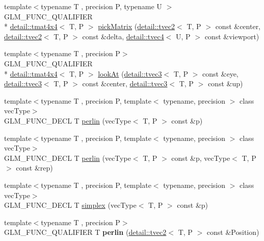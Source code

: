 \begin{DoxyCompactItemize}
\item 
{\footnotesize template$<$typename T , precision P, typename U $>$ }\\G\-L\-M\-\_\-\-F\-U\-N\-C\-\_\-\-Q\-U\-A\-L\-I\-F\-I\-E\-R \\*
\hyperlink{structglm_1_1detail_1_1tmat4x4}{detail\-::tmat4x4}$<$ T, P $>$ \hyperlink{group__gtc__matrix__transform_ga0fb64f04bf5ad52523fcd4b10b46aff6}{pick\-Matrix} (\hyperlink{structglm_1_1detail_1_1tvec2}{detail\-::tvec2}$<$ T, P $>$ const \&center, \hyperlink{structglm_1_1detail_1_1tvec2}{detail\-::tvec2}$<$ T, P $>$ const \&delta, \hyperlink{structglm_1_1detail_1_1tvec4}{detail\-::tvec4}$<$ U, P $>$ const \&viewport)
\item 
{\footnotesize template$<$typename T , precision P$>$ }\\G\-L\-M\-\_\-\-F\-U\-N\-C\-\_\-\-Q\-U\-A\-L\-I\-F\-I\-E\-R \\*
\hyperlink{structglm_1_1detail_1_1tmat4x4}{detail\-::tmat4x4}$<$ T, P $>$ \hyperlink{group__gtc__matrix__transform_ga454fdf3163c2779eeeeeb9d75907ce97}{look\-At} (\hyperlink{structglm_1_1detail_1_1tvec3}{detail\-::tvec3}$<$ T, P $>$ const \&eye, \hyperlink{structglm_1_1detail_1_1tvec3}{detail\-::tvec3}$<$ T, P $>$ const \&center, \hyperlink{structglm_1_1detail_1_1tvec3}{detail\-::tvec3}$<$ T, P $>$ const \&up)
\item 
{\footnotesize template$<$typename T , precision P, template$<$ typename, precision $>$ class vec\-Type$>$ }\\G\-L\-M\-\_\-\-F\-U\-N\-C\-\_\-\-D\-E\-C\-L T \hyperlink{group__gtc__noise_ga14e5975486b2b36e747861d3c65b16c1}{perlin} (vec\-Type$<$ T, P $>$ const \&p)
\item 
{\footnotesize template$<$typename T , precision P, template$<$ typename, precision $>$ class vec\-Type$>$ }\\G\-L\-M\-\_\-\-F\-U\-N\-C\-\_\-\-D\-E\-C\-L T \hyperlink{group__gtc__noise_ga7e103ffffacb322fe2d4863c372ae2fd}{perlin} (vec\-Type$<$ T, P $>$ const \&p, vec\-Type$<$ T, P $>$ const \&rep)
\item 
{\footnotesize template$<$typename T , precision P, template$<$ typename, precision $>$ class vec\-Type$>$ }\\G\-L\-M\-\_\-\-F\-U\-N\-C\-\_\-\-D\-E\-C\-L T \hyperlink{group__gtc__noise_ga05f5ab240c9a3fdeee353636e464c285}{simplex} (vec\-Type$<$ T, P $>$ const \&p)
\item 
\hypertarget{namespaceglm_aaf4944b3c2a00c1e7a1b25b96cea6bfb}{{\footnotesize template$<$typename T , precision P$>$ }\\G\-L\-M\-\_\-\-F\-U\-N\-C\-\_\-\-Q\-U\-A\-L\-I\-F\-I\-E\-R T {\bfseries perlin} (\hyperlink{structglm_1_1detail_1_1tvec2}{detail\-::tvec2}$<$ T, P $>$ const \&Position)}\label{namespaceglm_aaf4944b3c2a00c1e7a1b25b96cea6bfb}


\end{DoxyCompactItemize}
